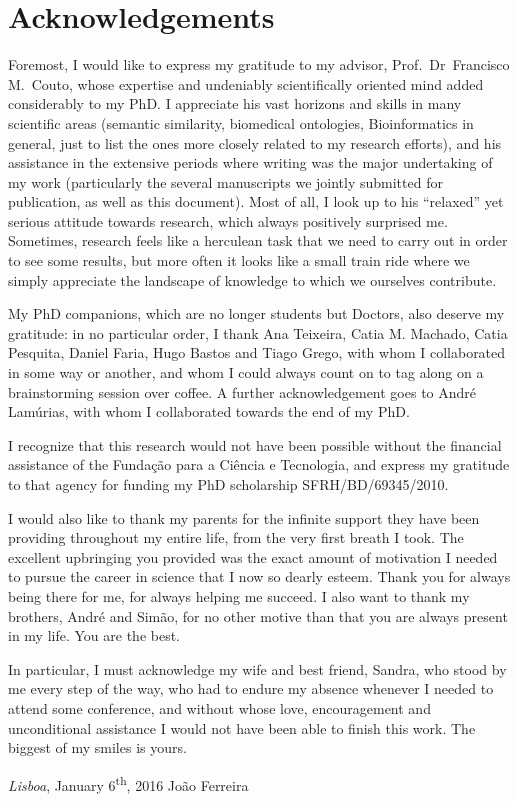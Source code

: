 \cleardoublepage
{}
\chapter*{Acknowledgements}

Foremost, I would like to express my gratitude to my advisor, Prof.~Dr~Francisco M.\ Couto, whose expertise and undeniably scientifically oriented mind added considerably to my PhD. I appreciate his vast horizons and skills in many scientific areas (\eg semantic similarity, biomedical ontologies, Bioinformatics in general, just to list the ones more closely related to my research efforts), and his assistance in the extensive periods where writing was the major undertaking of my work (particularly the several manuscripts we jointly submitted for publication, as well as this document). Most of all, I look up to his ``relaxed'' yet serious attitude towards research, which always positively surprised me. Sometimes, research feels like a herculean task that we need to carry out in order to see some results, but more often it looks like a small train ride where we simply appreciate the landscape of knowledge to which we ourselves contribute.

My PhD companions, which are no longer students but Doctors, also deserve my gratitude: in no particular order, I thank Ana Teixeira, Catia M. Machado, Catia Pesquita, Daniel Faria, Hugo Bastos and Tiago Grego, with whom I collaborated in some way or another, and whom I could always count on to tag along on a brainstorming session over coffee. A further acknowledgement goes to André Lamúrias, with whom I collaborated towards the end of my PhD.

I recognize that this research would not have been possible without the financial assistance of the Fundação para a Ciência e Tecnologia, and express my gratitude to that agency for funding my PhD scholarship SFRH\slash BD\slash 69345\slash 2010.

I would also like to thank my parents for the infinite support they have been providing throughout my entire life, from the very first breath I took. The excellent upbringing you provided was the exact amount of motivation I needed to pursue the career in science that I now so dearly esteem. Thank you for always being there for me, for always helping me succeed. I also want to thank my brothers, André and Simão, for no other motive than that you are always present in my life. You are the best.

In particular, I must acknowledge my wife and best friend, Sandra, who stood by me every step of the way, who had to endure my absence whenever I needed to attend some conference, and without whose love, encouragement and unconditional assistance I would not have been able to finish this work. The biggest of my smiles is yours.

\vfill

{\flushright
\textit{Lisboa}, January 6\textsuperscript{th}, 2016\break
João Ferreira
\par}
